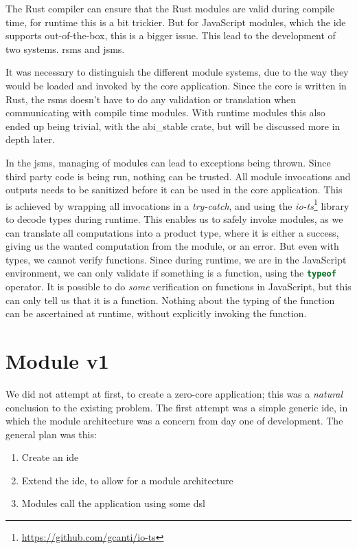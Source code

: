 The Rust compiler can ensure that the Rust modules are valid during compile
time, for runtime this is a bit trickier. But for JavaScript modules, which the
\gls*{ide} supports out-of-the-box, this is a bigger issue. This lead to the
development of two systems. \gls*{rsms} and \gls*{jsms}.

It was necessary to distinguish the different module systems, due to the way
they would be loaded and invoked by the core application. Since the core is
written in Rust, the \gls*{rsms} doesn't have to do any validation or
translation when communicating with compile time modules. With runtime modules
this also ended up being trivial, with the abi\_stable crate, but will be
discussed more in depth later.

In the \gls*{jsms}, managing of modules can lead to exceptions being thrown.
Since third party code is being run, nothing can be trusted. All module
invocations and outputs needs to be sanitized before it can be used in the core
application. This is achieved by wrapping all invocations in a
\textit{try-catch}, and using the \textit{io-ts}\footnote{\url{https://github.com/gcanti/io-ts}}
library to decode types during runtime. This enables us to safely invoke
modules, as we can translate all computations into a product type, where it is
either a success, giving us the wanted computation from the module, or an error.
But even with types, we cannot verify functions. Since during runtime, we are in
the JavaScript environment, we can only validate if something is a function,
using the \lstinline[language=JavaScript]{typeof} operator. It is possible to do
\textit{some} verification on functions in JavaScript, but this can only tell us
that it is a function. Nothing about the typing of the function can be
ascertained at runtime, without explicitly invoking the function.


\section{Module v1} \label{sec:mod1}

We did not attempt at first, to create a zero-core application; this was a
\textit{natural} conclusion to the existing problem. The first attempt was a
simple generic \gls*{ide}, in which the module architecture was a concern from
day one of development. The general plan was this:

\begin{enumerate}
  \item Create an \gls*{ide}
  \item Extend the \gls*{ide}, to allow for a module architecture
  \item Modules call the application using some \gls*{dsl}
\end{enumerate}

